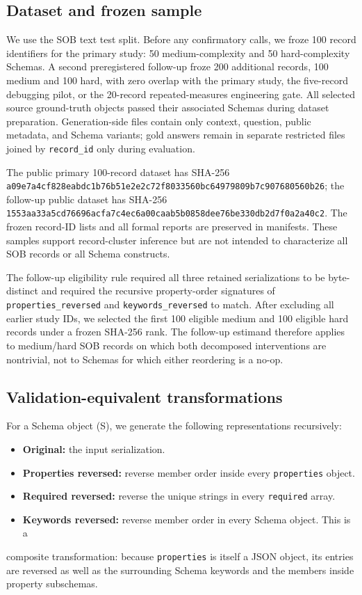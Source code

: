 \documentclass[10pt]{article}
\begin{document}
\subsection{Dataset and frozen sample}
We use the SOB text test split. Before any confirmatory calls, we froze 100 record identifiers for the primary study: 50 medium-complexity and 50 hard-complexity Schemas. A second preregistered follow-up froze 200 additional records, 100 medium and 100 hard, with zero overlap with the primary study, the five-record debugging pilot, or the 20-record repeated-measures engineering gate. All selected source ground-truth objects passed their associated Schemas during dataset preparation. Generation-side files contain only context, question, public metadata, and Schema variants; gold answers remain in separate restricted files joined by \texttt{record\_id} only during evaluation.

The public primary 100-record dataset has SHA-256 \texttt{a09e7a4c\allowbreak{}f828eabd\allowbreak{}c1b76b51\allowbreak{}e2e2c72f\allowbreak{}8033560b\allowbreak{}c6497980\allowbreak{}9b7c9076\allowbreak{}80560b26}; the follow-up public dataset has SHA-256 \texttt{1553aa33\allowbreak{}a5cd7669\allowbreak{}6acfa7c4\allowbreak{}ec6a00ca\allowbreak{}ab5b0858\allowbreak{}dee76be3\allowbreak{}30db2d7f\allowbreak{}0a2a40c2}. The frozen record-ID lists and all formal reports are preserved in manifests. These samples support record-cluster inference but are not intended to characterize all SOB records or all Schema constructs.

The follow-up eligibility rule required all three retained serializations to be byte-distinct and required the recursive property-order signatures of \texttt{properties\_reversed} and \texttt{keywords\_reversed} to match. After excluding all earlier study IDs, we selected the first 100 eligible medium and 100 eligible hard records under a frozen SHA-256 rank. The follow-up estimand therefore applies to medium/hard SOB records on which both decomposed interventions are nontrivial, not to Schemas for which either reordering is a no-op.

\subsection{Validation-equivalent transformations}
For a Schema object (S), we generate the following representations recursively:

\begin{itemize}
\item \textbf{Original:} the input serialization.
\item \textbf{Properties reversed:} reverse member order inside every \texttt{properties} object.
\item \textbf{Required reversed:} reverse the unique strings in every \texttt{required} array.
\item \textbf{Keywords reversed:} reverse member order in every Schema object. This is a
\end{itemize}
composite transformation: because \texttt{properties} is itself a JSON object, its entries are reversed as well as the surrounding Schema keywords and the members inside property subschemas.
\end{document}
